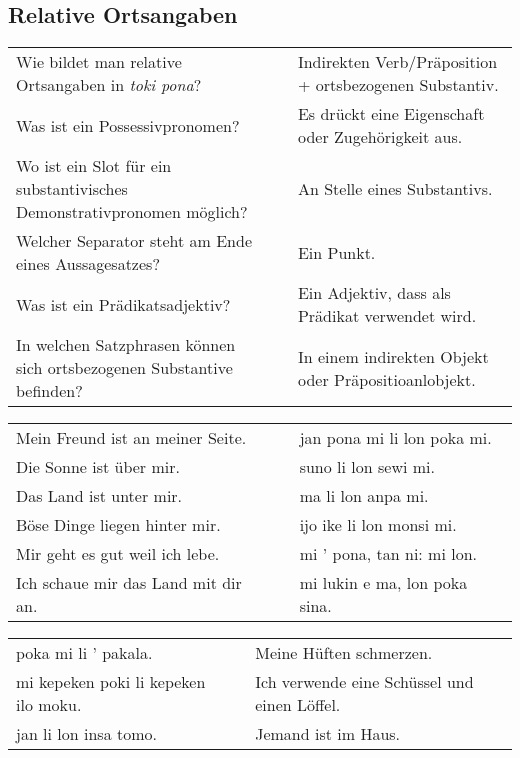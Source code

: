 \newpage
%
\subsection*{Relative Ortsangaben} 
\label{'other_prepositions'}

\begin{supertabular}{p{5,5cm}|ll}
Wie bildet man relative Ortsangaben in \textit{toki pona}? && Indirekten Verb/Präposition + ortsbezogenen Substantiv. \\ %
Was ist ein Possessivpronomen? && Es drückt eine Eigenschaft oder Zugehörigkeit aus.  \\ %
Wo ist ein Slot für ein substantivisches Demonstrativpronomen möglich? && An Stelle eines Substantivs. \\ %
Welcher Separator steht am Ende eines Aussagesatzes? && Ein Punkt. \\ %
Was ist ein Prädikatsadjektiv? && Ein Adjektiv, dass als Prädikat verwendet wird. \\ %
In welchen Satzphrasen können sich ortsbezogenen Substantive befinden? && In einem indirekten Objekt oder Präpositioanlobjekt.  \\ %
\end{supertabular}

\begin{supertabular}{p{5,5cm}|ll}
Mein Freund ist an meiner Seite.  && jan pona mi li lon poka mi. \\ %
Die Sonne ist über mir.  && suno li lon sewi mi. \\ %
Das Land ist unter mir.  && ma li lon anpa mi. \\ %
Böse Dinge liegen hinter mir.  && ijo ike li lon monsi mi. \\ %
Mir geht es gut weil ich lebe.  && mi ' pona, tan ni: mi lon. \\ %
Ich schaue mir das Land mit dir an.  && mi lukin e ma, lon poka sina. \\ %
\end{supertabular}  

\begin{supertabular}{p{5,5cm}|ll}
poka mi li ' pakala.  && Meine Hüften schmerzen. \\
mi kepeken poki li kepeken ilo moku.  && Ich verwende eine Schüssel und einen Löffel.\\
jan li lon insa tomo.  && Jemand ist im Haus. \\
\end{supertabular} 


